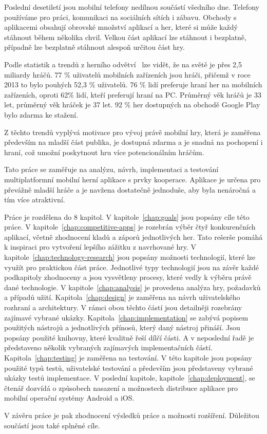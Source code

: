 \begin{introduction}
Poslední desetiletí jsou mobilní telefony nedílnou součástí všedního dne.
Telefony používáme pro práci, komunikaci na sociálních sítích i zábavu.
Obchody s aplikacemi obsahují obrovské množství aplikací a her,
které si může každý stáhnout během několika chvil.
Velkou část aplikací lze stáhnout i bezplatně,
případně lze bezplatně stáhnout alespoň určitou část hry.

Podle statistik a trendů z herního odvětví~\cite{wepc_video_game_statistics}
lze vidět,
že na světě je přes 2,5 miliardy hráčů.
77 \% uživatelů mobilních zařízeních jsou hráči,
přičemž v roce 2013 to bylo pouhých 52,3 \% uživatelů.
76 \% lidí preferuje hraní her na mobilních zařízeních,
oproti 62\% lidí, kteří preferují hraní na PC.
Průměrný věk hráčů je 33 let, průměrný věk hráček je 37 let.
92 \% her dostupných na obchodě Google Play bylo zdarma ke stažení.

Z těchto trendů vyplývá motivace pro vývoj právě mobilní hry,
která je zaměřena především na mladší část publika,
je dostupná zdarma a je snadná na pochopení i hraní,
což umožní poskytnout hru více potencionálním hráčům.

Tato práce se zaměřuje na analýzu, návrh, implementaci a testování
multiplatformní mobilní herní aplikace s prvky kooperace.
Aplikace je určena pro převážně mladší hráče
a je navžena dostatečně jednoduše,
aby byla nenáročná a tím více atraktivní.

Práce je rozdělena do 8 kapitol.
V kapitole~\ref{chap:goals} jsou popsány cíle této práce.
V kapitole~\ref{chap:competitive-apps} je rozebrán výběr čtyř konkurenčních aplikací,
včetně zhodnocení kladů a záporů jednotlivých her.
Tato rešerše pomáhá k inspiraci pro vytvoření lepšího zážitku z navrhované hry.
V kapitole~\ref{chap:technology-research} jsou popsány možnosti technologií,
které lze využít pro praktickou část práce.
Jednotlivé typy technologií jsou na závěr každé podkapitoly zhodnoceny
a jsou vysvětleny procesy, které vedly k výběru právě dané technologie.
V kapitole~\ref{chap:analysis} je provedena analýza hry, požadavků a případů užití.
Kapitola~\ref{chap:design} je zaměřena na návrh uživatelského rozhraní a
architektury.
V rámci obou těchto částí jsou detailněji rozebrány zajímavé vybrané ukázky.
Kapitola~\ref{chap:implementation} se zabývá popisem použitých nástrojů
a jednotlivých přínosů, který daný nástroj přináší.
Jsou popsány použité knihovny, které kvalitně řeší dílčí části.
A v neposlední řadě je představeno několik vybraných zajímavých
implementačních částí.
Kapitola~\ref{chap:testing} je zaměřena na testování.
V této kapitole jsou popsány použité typů testů,
uživatelské testování a především jsou představeny vybrané ukázky testů
implementace.
V poslední kapitole, kapitole~\ref{chap:deployment}, se čtenář dozvídá o způsobech nasazení a
možnostech distribuce aplikace pro mobilní operační systémy Android a iOS.

V závěru práce je pak zhodnocení výsledků práce a možnosti rozšíření.
Důležitou součástí jsou také splněné cíle.
\end{introduction}
